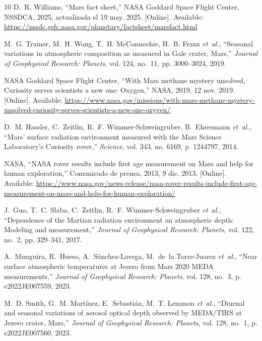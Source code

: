 \documentclass[conference]{IEEEtran}
\begin{document}
\begin{thebibliography}{10}
\BIBentryALTinterwordspacing
D.~R. Williams, ``Mars fact sheet,'' NASA Goddard Space Flight Center, NSSDCA,
  2025, actualizada el 19 may. 2025. [Online]. Available:
  \url{https://nssdc.gsfc.nasa.gov/planetary/factsheet/marsfact.html}
\BIBentrySTDinterwordspacing

M.~G. Trainer, M.~H. Wong, T.~H. McConnochie, H.~B. Franz \emph{et~al.},
  ``Seasonal variations in atmospheric composition as measured in {Gale}
  crater, {Mars},'' \emph{Journal of Geophysical Research: Planets}, vol. 124,
  no.~11, pp. 3000--3024, 2019.

\BIBentryALTinterwordspacing
{NASA Goddard Space Flight Center}, ``With {Mars} methane mystery unsolved,
  {Curiosity} serves scientists a new one: Oxygen,'' NASA, 2019, 12 nov. 2019.
  [Online]. Available:
  \url{https://www.nasa.gov/missions/with-mars-methane-mystery-unsolved-curiosity-serves-scientists-a-new-one-oxygen/}
\BIBentrySTDinterwordspacing

D.~M. Hassler, C.~Zeitlin, R.~F. Wimmer-Schweingruber, B.~Ehresmann
  \emph{et~al.}, ``Mars' surface radiation environment measured with the {Mars
  Science Laboratory}'s {Curiosity} rover,'' \emph{Science}, vol. 343, no.
  6169, p. 1244797, 2014.

\BIBentryALTinterwordspacing
{NASA}, ``{NASA} rover results include first age measurement on {Mars} and help
  for human exploration,'' Comunicado de prensa, 2013, 9 dic. 2013. [Online].
  Available:
  \url{https://www.nasa.gov/news-release/nasa-rover-results-include-first-age-measurement-on-mars-and-help-for-human-exploration/}
\BIBentrySTDinterwordspacing

J.~Guo, T.~C. Slaba, C.~Zeitlin, R.~F. Wimmer-Schweingruber \emph{et~al.},
  ``Dependence of the {Martian} radiation environment on atmospheric depth:
  Modeling and measurement,'' \emph{Journal of Geophysical Research: Planets},
  vol. 122, no.~2, pp. 329--341, 2017.

A.~Munguira, R.~Hueso, A.~S{\'a}nchez-Lavega, M.~de~la Torre-Juarez
  \emph{et~al.}, ``Near surface atmospheric temperatures at {Jezero} from {Mars
  2020 MEDA} measurements,'' \emph{Journal of Geophysical Research: Planets},
  vol. 128, no.~3, p. e2022JE007559, 2023.

M.~D. Smith, G.~M. Mart{\'i}nez, E.~Sebasti{\'a}n, M.~T. Lemmon \emph{et~al.},
  ``Diurnal and seasonal variations of aerosol optical depth observed by
  {MEDA/TIRS} at {Jezero} crater, {Mars},'' \emph{Journal of Geophysical
  Research: Planets}, vol. 128, no.~1, p. e2022JE007560, 2023.


\end{thebibliography}
\end{document}
